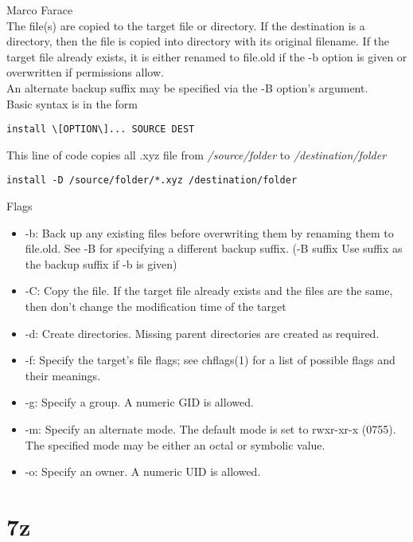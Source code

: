 \documentclass[hidelinks,12pt,a4paper,numbers=enddot]{scrartcl}
\begin{document}
\large Marco Farace \normalsize\\



The file(s) are copied to the target file or directory. If the destination
is a directory, then the file is copied into directory with its original
filename.  If the target file already exists, it is either renamed to
file.old if the -b option is given or overwritten if permissions allow.\\
An alternate backup suffix may be specified via the -B option's argument.\\
Basic syntax is in the form

\begin{verbatim}
install \[OPTION\]... SOURCE DEST
\end{verbatim}

This line of code copies all .xyz file from \emph{/source/folder} to \emph{/destination/folder}

\begin{verbatim}
install -D /source/folder/*.xyz /destination/folder
\end{verbatim}

Flags

\begin{itemize}
    \item -b: Back up any existing files before overwriting them by renaming
        them to file.old.  See -B for specifying a different backup suffix.
        (-B suffix Use suffix as the backup suffix if -b is given)
    \item -C: Copy the file.  If the target file already exists and the files
        are the same, then don't change the modification time of the target
    \item -d: Create directories.  Missing parent directories are created as required.
    \item -f: Specify the target's file flags; see chflags(1) for a list of
        possible flags and their meanings.
    \item -g: Specify a group.  A numeric GID is allowed.
    \item -m: Specify an alternate mode.  The default mode is set to rwxr-xr-x
        (0755). The specified mode may be either an octal or symbolic
        value.
    \item -o: Specify an owner.  A numeric UID is allowed.
\end{itemize}

\section{7z}
\end{document}
